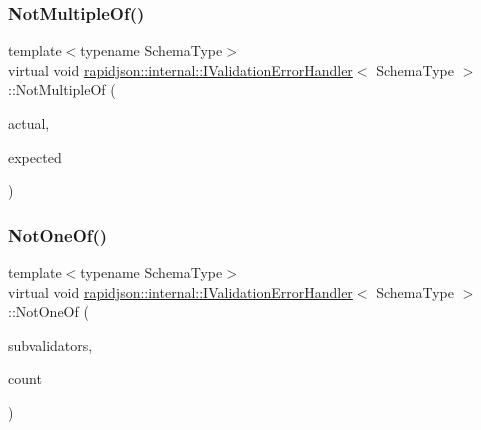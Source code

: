 \subsubsection{\texorpdfstring{NotMultipleOf()}{NotMultipleOf()}\hspace{0.1cm}{\footnotesize\ttfamily [3/3]}}
{\footnotesize\ttfamily template$<$typename Schema\+Type$>$ \\
virtual void \mbox{\hyperlink{classrapidjson_1_1internal_1_1_i_validation_error_handler}{rapidjson\+::internal\+::\+I\+Validation\+Error\+Handler}}$<$ Schema\+Type $>$\+::Not\+Multiple\+Of (\begin{DoxyParamCaption}\item[{double}]{actual,  }\item[{const \mbox{\hyperlink{classrapidjson_1_1internal_1_1_i_validation_error_handler_a8a2aaf7eb28a3ce7ed81689141f3af1f}{S\+Value}} \&}]{expected }\end{DoxyParamCaption})\hspace{0.3cm}{\ttfamily [pure virtual]}}

\mbox{\label{classrapidjson_1_1internal_1_1_i_validation_error_handler_a178e03c6aafa2b1c80ca08f7ebff3cd5}} 
\subsubsection{\texorpdfstring{NotOneOf()}{NotOneOf()}}
{\footnotesize\ttfamily template$<$typename Schema\+Type$>$ \\
virtual void \mbox{\hyperlink{classrapidjson_1_1internal_1_1_i_validation_error_handler}{rapidjson\+::internal\+::\+I\+Validation\+Error\+Handler}}$<$ Schema\+Type $>$\+::Not\+One\+Of (\begin{DoxyParamCaption}\item[{\mbox{\hyperlink{classrapidjson_1_1internal_1_1_i_schema_validator}{I\+Schema\+Validator}} $\ast$$\ast$}]{subvalidators,  }\item[{\mbox{\hyperlink{namespacerapidjson_a44eb33eaa523e36d466b1ced64b85c84}{Size\+Type}}}]{count }\end{DoxyParamCaption})\hspace{0.3cm}{\ttfamily [pure virtual]}}



